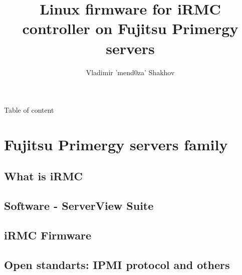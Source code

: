 \documentclass{beamer}
\author[Author, Vladimir Shakhov]{Vladimir 'mend0za' Shakhov}
\institute[Fujitsu Technology Solutions]
{
  Fujitsu Technology Solutions, R\&D department
}
\date[\now]
\title{Linux firmware for iRMC controller on Fujitsu Primergy servers}
\begin{document}

\begin{frame} 
  \titlepage 
\end{frame} 

\usebackgroundtemplate{} %

\begin{frame}{Table of content}
  \tableofcontents
\end{frame}


\section{Fujitsu Primergy servers family}
  \subsection{What is iRMC}
  \subsection{Software - ServerView Suite}
  \subsection{iRMC Firmware}
  \subsection{Open standarts: IPMI protocol and others}
\end{document}
